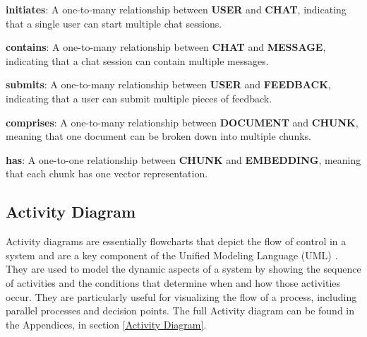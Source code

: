 \documentclass{l4proj}
\begin{document}
\textbf{initiates}: A one-to-many relationship between \textbf{USER} and \textbf{CHAT}, indicating that a single user can start multiple chat sessions.

\textbf{contains}: A one-to-many relationship between \textbf{CHAT} and \textbf{MESSAGE}, indicating that a chat session can contain multiple messages.

\textbf{submits}: A one-to-many relationship between \textbf{USER} and \textbf{FEEDBACK}, indicating that a user can submit multiple pieces of feedback.

\textbf{comprises}: A one-to-many relationship between \textbf{DOCUMENT} and \textbf{CHUNK}, meaning that one document can be broken down into multiple chunks.

\textbf{has}: A one-to-one relationship between \textbf{CHUNK} and \textbf{EMBEDDING}, meaning that each chunk has one vector representation.

\subsection{Activity Diagram}

Activity diagrams are essentially flowcharts that depict the flow of control in a system and are a key component of the Unified Modeling Language (UML) \citep{doiDrawingActivity}. They are used to model the dynamic aspects of a system by showing the sequence of activities and the conditions that determine when and how those activities occur. They are particularly useful for visualizing the flow of a process, including parallel processes and decision points. The full Activity diagram can be found in the Appendices, in section \ref{Activity Diagram}.
\end{document}
